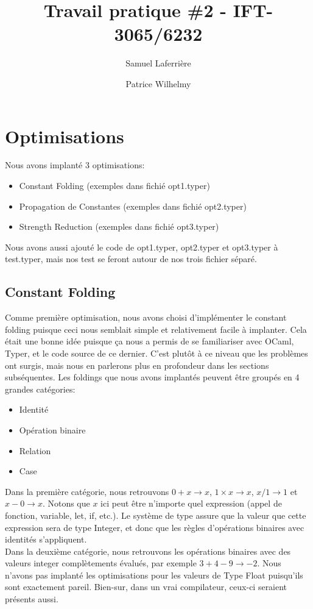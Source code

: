 \documentclass{article}
\title{Travail pratique \#2 - IFT-3065/6232}
\author{Samuel Laferrière \and Patrice Wilhelmy}
\begin{document}
\maketitle

\section{Optimisations}
Nous avons implanté 3 optimisations:
\begin{itemize}
\item Constant Folding (exemples dans fichié opt1.typer)
\item Propagation de Constantes (exemples dans fichié opt2.typer)
\item Strength Reduction (exemples dans fichié opt3.typer)
\end{itemize}
Nous avons aussi ajouté le code de opt1.typer, opt2.typer et opt3.typer à test.typer, mais nos test se feront autour de nos trois fichier séparé. 
\subsection{Constant Folding}

Comme première optimisation, nous avons choisi d'implémenter le constant folding puisque ceci nous semblait simple et relativement facile à implanter. Cela était une bonne idée puisque ça nous a permis de se familiariser avec OCaml, Typer, et le code source de ce dernier. C'est plutôt à ce niveau que les problèmes ont surgis, mais nous en parlerons plus en profondeur dans les sections subséquentes. Les foldings que nous avons implantés peuvent être groupés en 4 grandes catégories:
\begin{itemize}
\item Identité
\item Opération binaire
\item Relation
\item Case
\end{itemize}

Dans la première catégorie, nous retrouvons $0+x \rightarrow x$, $1 \times x \rightarrow x$, $x/1\rightarrow 1$ et $x-0 \rightarrow x$. Notons que $x$ ici peut être n'importe quel expression (appel de fonction, variable, let, if, etc.). Le système de type assure que la valeur que cette expression sera de type Integer, et donc que les règles d'opérations binaires avec identités s'appliquent.\\

Dans la deuxième catégorie, nous retrouvons les opérations binaires avec des valeurs integer complètements évalués, par exemple $3+4-9 \rightarrow -2$. Nous n'avons pas implanté les optimisations pour les valeurs de Type Float puisqu'ils sont exactement pareil. Bien-sur, dans un vrai compilateur, ceux-ci seraient présents aussi. \\
\end{document}
